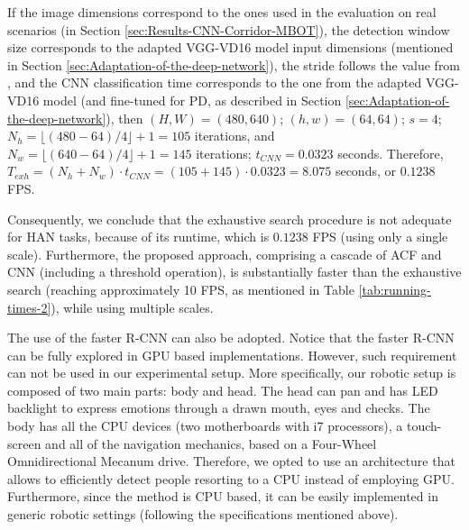 \documentclass[5p,time]{elsarticle}
\begin{document}
If the image dimensions correspond to the ones used in the evaluation on real scenarios (in Section \ref{sec:Results-CNN-Corridor-MBOT}), the detection window size corresponds to the adapted VGG-VD16 model input dimensions (mentioned in Section \ref{sec:Adaptation-of-the-deep-network}), the stride follows the value from \cite{DollarPAMI2014}, and the CNN classification time corresponds to the one from the adapted VGG-VD16 model (and fine-tuned for PD, as described in Section \ref{sec:Adaptation-of-the-deep-network}), then $(H,W) = (480,640)$; $(h,w) = (64,64)$; $s=4$; $N_h = \lfloor{(480-64)/4}\rfloor +1 = 105$ iterations, and $N_w=\lfloor{(640-64)/4}\rfloor +1 = 145$ iterations; $t_{CNN}=0.0323$ seconds. Therefore, $T_{exh}= (N_h + N_w) \cdot t_{CNN} = (105+145) \cdot 0.0323 = 8.075$ seconds, or $0.1238$ FPS.

Consequently, we conclude that the exhaustive search procedure is not adequate for HAN tasks, because of its runtime, which is $0.1238$ FPS (using only a single scale). Furthermore, the proposed approach, comprising a cascade of ACF and CNN (including a threshold operation), is substantially faster than the exhaustive search (reaching approximately 10 FPS, as mentioned in Table \ref{tab:running-times-2}), while using multiple scales.

The use of the faster R-CNN can also be adopted. Notice that the faster R-CNN can be fully explored in GPU based implementations. However, such requirement can not be used in our experimental setup. More specifically, our robotic setup is composed of two main parts: body and head. The head can pan and has LED backlight to express emotions through a drawn mouth, eyes and checks. The body has all the CPU devices (two motherboards with i7 processors), a touch-screen and all of the navigation mechanics, based on a Four-Wheel Omnidirectional Mecanum drive. Therefore, we opted to use an architecture that allows to efficiently detect people resorting to a CPU instead of employing GPU. Furthermore, since the method is CPU based, it can be easily implemented in generic robotic settings (following the specifications mentioned above).
\end{document}
